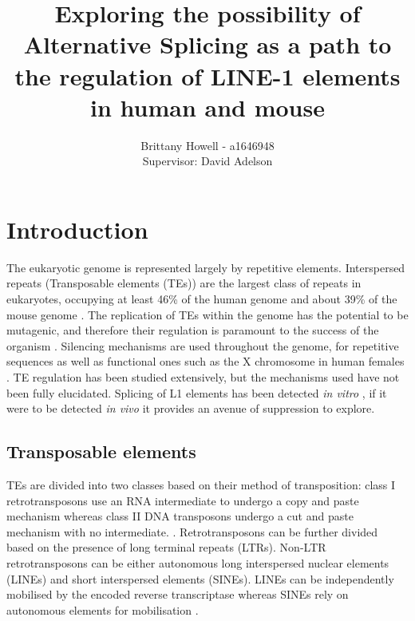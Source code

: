 \documentclass[12pt]{article}
\begin{document}
	
	\title{Exploring the possibility of Alternative Splicing as a path to the regulation of LINE-1 elements in human and mouse}
	\author{Brittany Howell - a1646948 \\ Supervisor: David Adelson}
	\date{}
	
	\maketitle
	
	
	\section{Introduction}
		
		The eukaryotic genome is represented largely by repetitive elements. Interspersed repeats (Transposable elements (TEs)) are the largest class of repeats in eukaryotes, occupying at least 46\% of the human genome \citep{Lander01} and about 39\% of the mouse genome \citep{Waterson02}. The replication of TEs within the genome has the potential to be mutagenic, and therefore their regulation is paramount to the success of the organism \citep{Bodak14}. Silencing mechanisms are used throughout the genome, for repetitive sequences as well as functional ones such as the X chromosome in human females \citep{EnLi14}. TE regulation has been studied extensively, but the mechanisms used have not been fully elucidated. Splicing of L1 elements has been detected \textit{in vitro} \citep{Belancio06}, if it were to be detected \textit{in vivo} it provides an avenue of suppression to explore. 
			
		
		\subsection{Transposable elements}
			
			TEs are divided into two classes based on their method of transposition: class I retrotransposons use an RNA intermediate to undergo a copy and paste mechanism whereas class II DNA transposons undergo a cut and paste mechanism with no intermediate. \citep{Feschotte07,Wicker07,Han10,Finnegan89}. Retrotransposons can be further divided based on the presence of long terminal repeats (LTRs). Non-LTR retrotransposons can be either autonomous long interspersed nuclear elements (LINEs) and short interspersed elements (SINEs). LINEs can be independently mobilised by the encoded reverse transcriptase whereas SINEs rely on autonomous elements for mobilisation \citep{Jurka07}.
			
\end{document}
